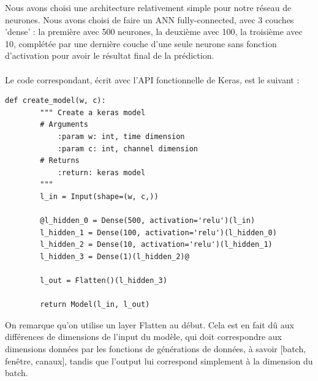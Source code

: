 \documentclass{article}
\begin{document}
    Nous avons choisi une architecture relativement simple pour notre réseau de neurones. Nous avons choisi de faire un ANN fully-connected, avec 3 couches 'dense' : la première avec 500 neurones, la deuxième avec 100, la troisième avec 10, complétée par une dernière couche d'une seule neurone sans fonction d'activation pour avoir le résultat final de la prédiction.\\\\Le code correspondant, écrit avec l'API fonctionnelle de Keras, est le suivant :\\
    \begin{lstlisting}[frame=single]
        def create_model(w, c):
        """ Create a keras model
        # Arguments
            :param w: int, time dimension
            :param c: int, channel dimension
        # Returns
            :return: keras model
        """
        l_in = Input(shape=(w, c,))  
        
        @l_hidden_0 = Dense(500, activation='relu')(l_in)
        l_hidden_1 = Dense(100, activation='relu')(l_hidden_0)
        l_hidden_2 = Dense(10, activation='relu')(l_hidden_1)
        l_hidden_3 = Dense(1)(l_hidden_2)@
        
        l_out = Flatten()(l_hidden_3)

        return Model(l_in, l_out)
    \end{lstlisting}

    On remarque qu'on utilise un layer Flatten au début. Cela est en fait dû aux différences de dimensions de l'input du modèle, qui doit correspondre aux dimensions données par les fonctions de générations de données, à savoir [batch, fenêtre, canaux], tandis que l'output lui correspond simplement à la dimension du batch.
\end{document}
